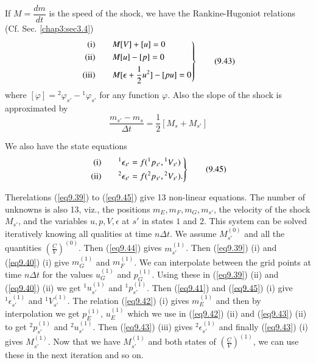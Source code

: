 If $M  = \dfrac{dm}{dt}$ is the speed of the shock, we have the Rankine-Hugoniot relations (Cf. Sec. \ref{chap3:sec3.4})
\begin{equation*}
\left. 
\begin{aligned}
{\rm (i)} & \qquad M[V] + [u] = 0\\
{\rm (ii)} & \qquad  M[u] - [p] = 0\\
{\rm (iii)} & \qquad M[\epsilon + \frac{1}{2} u^2] - [pu] = 0\\
\end{aligned}
\right\} \tag{9.43}\label{eq9.43}
\end{equation*}
where $[\varphi] = {}^2 \varphi_{s'} - {}^1 \varphi_{s'}$ for any function $\varphi$. Also the slope of the shock is approximated by
\begin{equation*}
\frac{m_{s'} - m_s}{\Delta t} = \frac{1}{2} [M_s + M_{s'}] \tag{9.44}\label{eq9.44}
\end{equation*}

We also have the state equations
\begin{equation*}
\left.
\begin{aligned}
{\rm (i)} & \qquad {}^1\epsilon_{s'} = f({}^1 p_{s'}, {}^1 V_{s'})\\
{\rm (ii)} & \qquad {}^2 \epsilon_{s'} = f({}^2 p_{s'}, {}^2 V_{s'}). \\
\end{aligned}
\right\}
\tag{9.45}\label{eq9.45}
\end{equation*}

The\pageoriginale relations (\ref{eq9.39}) to (\ref{eq9.45}) give 13
non-linear equations. The number of unknowns is also 13, viz., the
positions $m_E, m_F, m_G, m_{s'}$, the velocity of the shock $M_{s'}$,
and the variables $u,p,V, \epsilon$ at $s'$ in states $1$ and
$2$. This system can be solved iteratively knowing all qualities at
time $n\Delta t$. We assume $M^{(0)}_{s'}$ and all the quantities
$(\frac{C}{V})^{(0)}$. Then (\ref{eq9.44}) gives
$m^{(1)}_{s'}$. Then (\ref{eq9.39}) (i) and (\ref{eq9.40}) (i) give
$m^{(1)}_G$ and $m^{(1)}_F$. We can interpolate between the grid
points at time $n\Delta t$ for the values $u^{(1)}_G$ and
$p^{(1)}_G$. Using these in (\ref{eq9.39}) (ii) and (\ref{eq9.40})
(ii) we get ${}^1 u^{(1)}_{s'}$ and ${}^1 p^{(1)}_{s'}$. Then
(\ref{eq9.41}) and (\ref{eq9.45})  (i) give ${}^1 \epsilon^{(1)}_{s'}$
and ${}^1 V^{(1)}_{s'}$. The relation (\ref{eq9.42}) (i) gives
$m^{(1)}_E$ and then by interpolation we get $p^{(1)}_E$, $u^{(1)}_E$
which we use in (\ref{eq9.42}) (ii) and (\ref{eq9.43}) (ii) to get
${}^2p^{(1)}_{s'}$ and ${}^2 u^{(1)}_{s'}$. Then (\ref{eq9.43}) (iii)
gives ${}^2 \epsilon^{(1)}_{s'}$ and finally (\ref{eq9.43}) (i) gives
$M^{(1)}_{s'}$. Now that we have $M^{(1)}_{s'}$ and both states of
$(\frac{C}{V})^{(1)}$, we can use these in the next iteration and so
on. 

